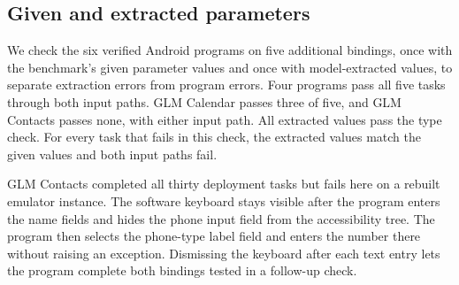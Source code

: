 \subsection{Given and extracted parameters}
\label{app:given-extracted}
We check the six verified Android programs on five additional bindings, once with the benchmark's given parameter values and once with model-extracted values, to separate extraction errors from program errors.
Four programs pass all five tasks through both input paths.
GLM Calendar passes three of five, and GLM Contacts passes none, with either input path.
All extracted values pass the type check.
For every task that fails in this check, the extracted values match the given values and both input paths fail.

GLM Contacts completed all thirty deployment tasks but fails here on a rebuilt emulator instance.
The software keyboard stays visible after the program enters the name fields and hides the phone input field from the accessibility tree.
The program then selects the phone-type label field and enters the number there without raising an exception.
Dismissing the keyboard after each text entry lets the program complete both bindings tested in a follow-up check.

